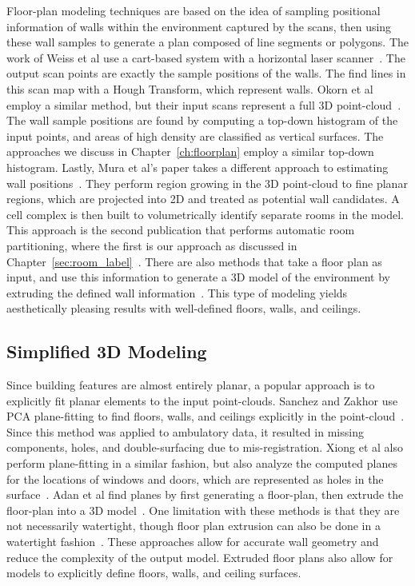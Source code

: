 \documentclass[12pt,onecolumn,oneside]{book}
\begin{document}
Floor-plan modeling techniques are based on the idea of sampling positional information of walls within the environment captured by the scans, then using these wall samples to generate a plan composed of line segments or polygons.  The work of Weiss et al use a cart-based system with a horizontal laser scanner~\cite{Weiss05}.  The output scan points are exactly the sample positions of the walls.  The find lines in this scan map with a Hough Transform, which represent walls.  Okorn et al employ a similar method, but their input scans represent a full 3D point-cloud~\cite{Okorn09}.  The wall sample positions are found by computing a top-down histogram of the input points, and areas of high density are classified as vertical surfaces.  The approaches we discuss in Chapter~\ref{ch:floorplan} employ a similar top-down histogram.  Lastly, Mura et al's paper takes a different approach to estimating wall positions~\cite{Mura13}.  They perform region growing in the 3D point-cloud to fine planar regions, which are projected into 2D and treated as potential wall candidates.  A cell complex is then built to volumetrically identify separate rooms in the model.  This approach is the second publication that performs automatic room partitioning, where the first is our approach as discussed in Chapter~\ref{sec:room_label}~\cite{Turner14}.  There are also methods that take a floor plan as input, and use this information to generate a 3D model of the environment by extruding the defined wall information~\cite{Or05,Lewis98}.  This type of modeling yields aesthetically pleasing results with well-defined floors, walls, and ceilings.

\subsection{Simplified 3D Modeling}
\label{ssec:background_planefit}

Since building features are almost entirely planar, a popular approach is to explicitly fit planar elements to the input point-clouds.  Sanchez and Zakhor use PCA plane-fitting to find floors, walls, and ceilings explicitly in the point-cloud~\cite{Victors}. Since this method was applied to ambulatory data, it resulted in missing components, holes, and double-surfacing due to mis-registration.  Xiong et al also perform plane-fitting in a similar fashion, but also analyze the computed planes for the locations of windows and doors, which are represented as holes in the surface~\cite{Xiong13}.  Adan et al find planes by first generating a floor-plan, then extrude the floor-plan into a 3D model~\cite{WallFinder}.  One limitation with these methods is that they are not necessarily watertight, though floor plan extrusion can also be done in a watertight fashion~\cite{Mura14,Turner14,Cabral14}.  These approaches allow for accurate wall geometry and reduce the complexity of the output model. Extruded floor plans also allow for models to explicitly define floors, walls, and ceiling surfaces.  
\end{document}
